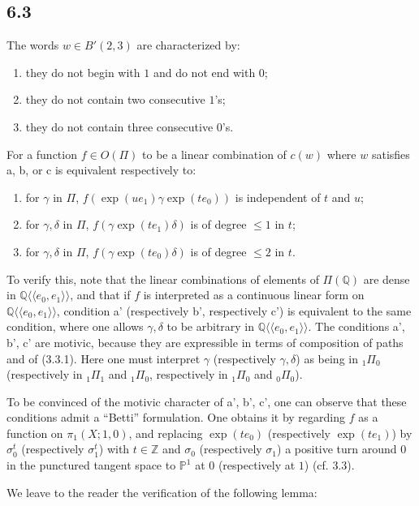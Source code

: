 \documentclass[11pt]{article}
\newcommand{\Q}{\mathbb Q}
\newcommand{\Z}{\mathbb Z}
\newcommand{\PP}{\mathbb P}
\begin{document}
\subsection*{6.3}
The words $w\in B'(2,3)$ are characterized by:
\begin{enumerate}[label=\alph*.]
\item they do not begin with $1$ and do not end with $0$;
\item they do not contain two consecutive $1$'s;
\item they do not contain three consecutive $0$'s.
\end{enumerate}
For a function $f\in O(\Pi)$ to be a linear combination of $c(w)$ where $w$ satisfies a, b, or c is equivalent respectively to:
\begin{enumerate}[label=\alph*'.]
\item for $\gamma$ in $\Pi$, $f(\exp(ue_1)\gamma\exp(te_0))$ is independent of $t$ and $u$;
\item for $\gamma,\delta$ in $\Pi$, $f(\gamma\exp(te_1)\delta)$ is of degree $\leq1$ in $t$;
\item for $\gamma,\delta$ in $\Pi$, $f(\gamma\exp(te_0)\delta)$ is of degree $\leq2$ in $t$.
\end{enumerate}
To verify this, note that the linear combinations of elements of $\Pi(\Q)$ are dense in $\Q\langle\!\langle e_0,e_1\rangle\!\rangle$, and that if $f$ is interpreted as a continuous linear form on $\Q\langle\!\langle e_0,e_1\rangle\!\rangle$, condition a' (respectively b', respectively c') is equivalent to the same condition, where one allows $\gamma,\delta$ to be arbitrary in $\Q\langle\!\langle e_0,e_1\rangle\!\rangle$.
The conditions a', b', c' are motivic, because they are expressible in terms of composition of paths and of (3.3.1).
Here one must interpret $\gamma$ (respectively $\gamma,\delta$) as being in ${}_1\Pi_0$ (respectively in ${}_1\Pi_1$ and ${}_1\Pi_0$, respectively in ${}_1\Pi_0$ and ${}_0\Pi_0$).

To be convinced of the motivic character of a', b', c', one can observe that these conditions admit a ``Betti'' formulation.
One obtains it by regarding $f$ as a function on $\pi_1(X;1,0)$, and replacing $\exp(te_0)$ (respectively $\exp(te_1)$) by $\sigma_0^t$ (respectively $\sigma_1^t$) with $t\in\Z$ and $\sigma_0$ (respectively $\sigma_1$) a positive turn around $0$ in the punctured tangent space to $\PP^1$ at $0$ (respectively at $1$) (cf. 3.3).

We leave to the reader the verification of the following lemma:
\end{document}
